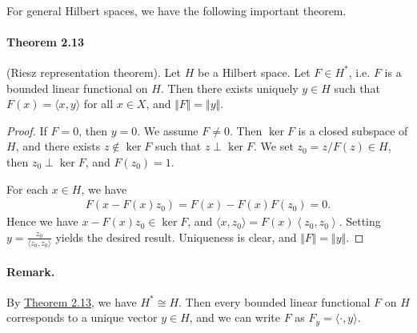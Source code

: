\documentclass{article}
\begin{document}
\paragraph{} For general Hilbert spaces, we have the following important theorem.

\paragraph{Theorem 2.13\label{thm:2.13}} (Riesz representation theorem). Let $H$ be a Hilbert space. Let $F\in H^*$, i.e. $F$ is a bounded linear functional on $H$. Then there exists uniquely $y\in H$ such that $F(x) = \langle x,y\rangle$ for all $x\in X$, and $\Vert F\Vert = \Vert y\Vert$.
\begin{proof}
If $F=0$, then $y=0$. We assume $F\neq 0$. Then $\ker F$ is a closed subspace of $H$, and there exists $z\notin \ker F$ such that $z\perp\ker F$. We set $z_0 = z/F(z)\in H$, then $z_0\perp \ker F$, and $F(z_0)=1$.
\vspace{0.1cm}

For each $x\in H$, we have
\begin{align*}
	F(x-F(x)z_0) = F(x) - F(x)F(z_0) = 0.
\end{align*}
Hence we have $x-F(x)z_0\in\ker F$, and $\langle x,z_0\rangle = F(x)\left\langle z_0,z_0\right\rangle$. Setting $y=\frac{z_0}{\langle z_0,z_0\rangle}$ yields the desired result. Uniqueness is clear, and $\Vert F\Vert = \Vert y\Vert$.
\end{proof}
\paragraph{Remark.} By \hyperref[thm:2.13]{Theorem 2.13}, we have $H^*\cong H$. Then every bounded linear functional $F$ on $H$ corresponds to a unique vector $y\in H$, and we can write $F$ as $F_y=\langle\cdot,y\rangle$.
\end{document}
